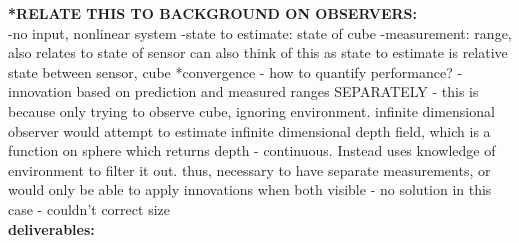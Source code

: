 \textbf{*RELATE THIS TO BACKGROUND ON OBSERVERS:}\\
-no input, nonlinear system
-state to estimate: state of cube
-measurement: range, also relates to state of sensor
can also think of this as state to estimate is relative state between sensor, cube
*convergence - how to quantify performance?
-innovation based on prediction and measured ranges SEPARATELY - this is because only trying to observe cube, ignoring environment. infinite dimensional observer would attempt to estimate infinite dimensional depth field, which is a function on sphere which returns depth - continuous. Instead uses knowledge of environment to filter it out. thus, necessary to have separate measurements, or would only be able to apply innovations when both visible - no solution in this case - couldn't correct size\\










\textbf{deliverables:} \\

